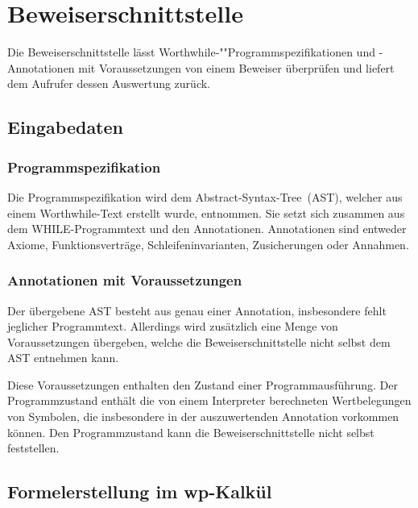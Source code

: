 \section{Beweiserschnittstelle}%

Die Beweiserschnittstelle lässt Worthwhile-""Programmspezifikationen
und -Annotationen mit Voraussetzungen von einem Beweiser überprüfen
und liefert dem Aufrufer dessen Auswertung zurück.%

\subsection{Eingabedaten}%

\subsubsection{Programmspezifikation}%


Die Programmspezifikation wird dem Abstract-Syntax-Tree~(AST), welcher
aus einem Worthwhile-Text erstellt wurde, entnommen. Sie setzt sich
zusammen aus dem WHILE-Programmtext und den Annotationen. Annotationen
sind entweder Axiome, Funktionsverträge, Schleifeninvarianten,
Zusicherungen oder Annahmen.%

\subsubsection{Annotationen mit Voraussetzungen}%

Der übergebene AST besteht aus genau einer Annotation, insbesondere
fehlt jeglicher Programmtext. Allerdings wird zusätzlich eine Menge
von Voraussetzungen übergeben, welche die Beweiserschnittstelle nicht
selbst dem AST entnehmen kann.%


Diese Voraussetzungen enthalten den Zustand einer Programmausführung.
Der Programmzustand enthält
die von einem Interpreter berechneten Wertbelegungen von Symbolen, die
insbesondere in der auszuwertenden Annotation vorkommen können. Den
Programmzustand kann die Beweiserschnittstelle nicht selbst
feststellen.

\subsection{Formelerstellung im wp-Kalkül}%

